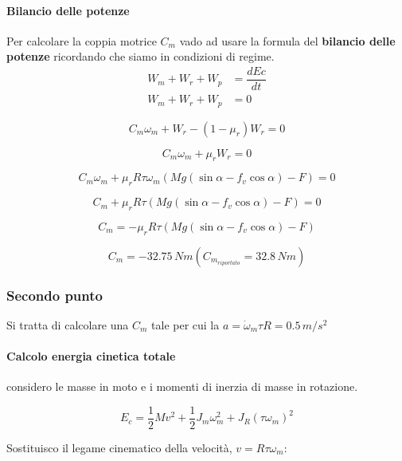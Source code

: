 \documentclass[main.tex]{subfiles}
\begin{document}
\paragraph{Bilancio delle potenze}
Per calcolare la coppia motrice $C_m$ vado ad usare la formula del \textbf{bilancio delle potenze} ricordando che siamo in condizioni di regime.
\begin{align*}
	W_m + W_r + W_p &= \dfrac{dEc}{dt} \\
	W_m + W_r + W_p &= 0
\end{align*}

\begin{equation}
	C_m\omega_m + W_r  - (1-\mu_r)W_r = 0
\end{equation}

\begin{equation}
	C_m\omega_m + \mu_rW_r = 0
\end{equation}

\begin{equation}
	C_m\omega_m + \mu_rR\tau\omega_m(Mg(\sin\alpha - f_v\cos\alpha) - F) = 0
\end{equation}

\begin{equation}
	C_m + \mu_rR\tau(Mg(\sin\alpha - f_v\cos\alpha) - F) = 0
\end{equation}

\begin{equation}
	C_m = - \mu_rR\tau(Mg(\sin\alpha - f_v\cos\alpha) - F)
\end{equation}

\begin{equation}
	C_m = -32.75\,Nm (C_{m_{riportato}} = 32.8\,Nm)
\end{equation}

\subsubsection{Secondo punto}
Si tratta di calcolare una $C_m$ tale per cui la $a = \dot{\omega}_m\tau R = 0.5\,m/s^2$

\paragraph{Calcolo energia cinetica totale} considero le masse in moto e i momenti di inerzia di masse in rotazione.

\[
	E_c = \dfrac{1}{2}Mv^2 + \dfrac{1}{2}J_m\omega_m^2 + J_R(\tau\omega_m)^2
\]

Sostituisco il legame cinematico della velocità, $v = R\tau\omega_m$:
\end{document}
